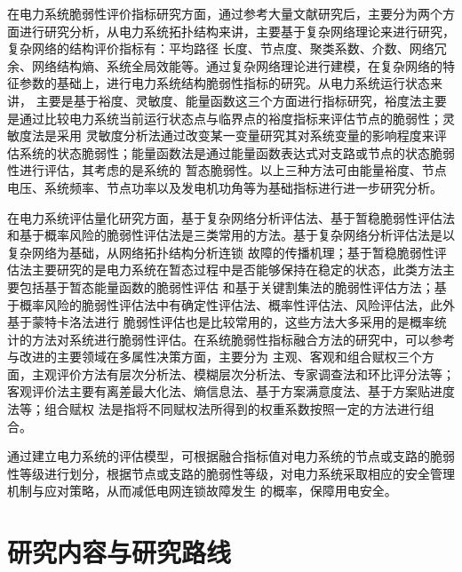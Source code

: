 在电力系统脆弱性评价指标研究方面，通过参考大量文献研究后，主要分为两个方面进行研究分析，从电力系统拓扑结构来讲，主要基于复杂网络理论来进行研究，复杂网络的结构评价指标有：平均路径
长度、节点度、聚类系数、介数、网络冗余、网络结构熵、系统全局效能等。通过复杂网络理论进行建模，在复杂网络的特征参数的基础上，进行电力系统结构脆弱性指标的研究。从电力系统运行状态来讲，
主要是基于裕度、灵敏度、能量函数这三个方面进行指标研究，裕度法主要是通过比较电力系统当前运行状态点与临界点的裕度指标来评估节点的脆弱性\cite{refs42,refs43,refs44}；灵敏度法是采用
灵敏度分析法通过改变某一变量研究其对系统变量的影响程度来评估系统的状态脆弱性\cite{refs45,refs46}；能量函数法是通过能量函数表达式对支路或节点的状态脆弱性进行评估，其考虑的是系统的
暂态脆弱性\cite{refs47,refs48,refs49}。以上三种方法可由能量裕度、节点电压、系统频率、节点功率以及发电机功角等为基础指标进行进一步研究分析。

在电力系统评估量化研究方面，基于复杂网络分析评估法、基于暂稳脆弱性评估法和基于概率风险的脆弱性评估法是三类常用的方法。基于复杂网络分析评估法是以复杂网络为基础，从网络拓扑结构分析连锁
故障的传播机理\cite{refs50,refs51,refs52}；基于暂稳脆弱性评估法主要研究的是电力系统在暂态过程中是否能够保持在稳定的状态，此类方法主要包括基于暂态能量函数的脆弱性评估\cite{refs53}
和基于关键割集法的脆弱性评估方法\cite{refs54}；基于概率风险的脆弱性评估法中有确定性评估法\cite{refs55}、概率性评估法\cite{refs56}、风险评估法\cite{refs57}，此外基于蒙特卡洛法进行
脆弱性评估\cite{refs58}也是比较常用的，这些方法大多采用的是概率统计的方法对系统进行脆弱性评估。在系统脆弱性指标融合方法的研究中，可以参考与改进的主要领域在多属性决策方面，主要分为
主观、客观和组合赋权三个方面，主观评价方法有层次分析法、模糊层次分析法、专家调查法和环比评分法等；客观评价法主要有离差最大化法、熵信息法、基于方案满意度法、基于方案贴进度法等；组合赋权
法是指将不同赋权法所得到的权重系数按照一定的方法进行组合\cite{refs59}。

通过建立电力系统的评估模型，可根据融合指标值对电力系统的节点或支路的脆弱性等级进行划分，根据节点或支路的脆弱性等级，对电力系统采取相应的安全管理机制与应对策略，从而减低电网连锁故障发生
的概率，保障用电安全。



\section{研究内容与研究路线}
\label{sec:research_curise}

